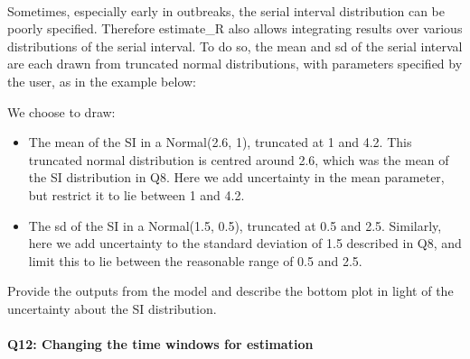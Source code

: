 \documentclass[
  11pt,
]{article}
\newenvironment{Shaded}{\begin{snugshade}}{\end{snugshade}}
\newcommand{\AttributeTok}[1]{\textcolor[rgb]{0.77,0.63,0.00}{#1}}
\newcommand{\DecValTok}[1]{\textcolor[rgb]{0.00,0.00,0.81}{#1}}
\newcommand{\FloatTok}[1]{\textcolor[rgb]{0.00,0.00,0.81}{#1}}
\newcommand{\FunctionTok}[1]{\textcolor[rgb]{0.00,0.00,0.00}{#1}}
\newcommand{\NormalTok}[1]{#1}
\newcommand{\OtherTok}[1]{\textcolor[rgb]{0.56,0.35,0.01}{#1}}
\newcommand{\SpecialCharTok}[1]{\textcolor[rgb]{0.00,0.00,0.00}{#1}}
\newcommand{\StringTok}[1]{\textcolor[rgb]{0.31,0.60,0.02}{#1}}
\begin{document}
~

Sometimes, especially early in outbreaks, the serial interval
distribution can be poorly specified. Therefore estimate\_R also allows
integrating results over various distributions of the serial interval.
To do so, the mean and sd of the serial interval are each drawn from
truncated normal distributions, with parameters specified by the user,
as in the example below:

We choose to draw:

\begin{itemize}
\item
  The mean of the SI in a Normal(2.6, 1), truncated at 1 and 4.2. This
  truncated normal distribution is centred around 2.6, which was the
  mean of the SI distribution in Q8. Here we add uncertainty in the mean
  parameter, but restrict it to lie between 1 and 4.2.
\item
  The sd of the SI in a Normal(1.5, 0.5), truncated at 0.5 and 2.5.
  Similarly, here we add uncertainty to the standard deviation of 1.5
  described in Q8, and limit this to lie between the reasonable range of
  0.5 and 2.5.
\end{itemize}

Provide the outputs from the model and describe the bottom plot in light
of the uncertainty about the SI distribution.

\begin{Shaded}
\end{Shaded}

\hypertarget{q12-changing-the-time-windows-for-estimation}{%
\paragraph{Q12: Changing the time windows for
estimation}\label{q12-changing-the-time-windows-for-estimation}}
\end{document}
